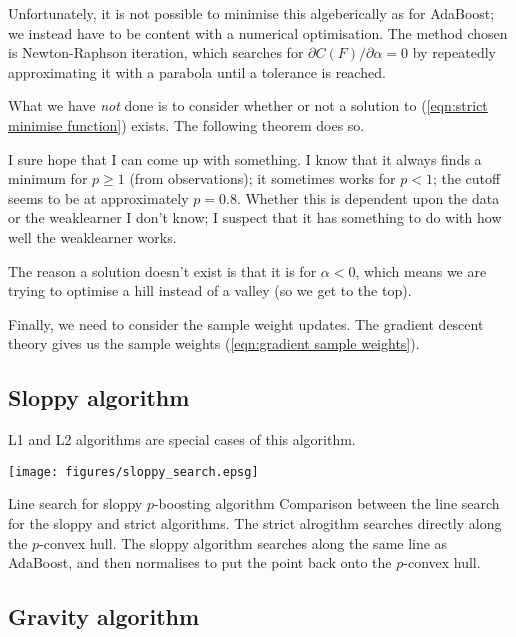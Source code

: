 Unfortunately, it is not possible to minimise this algeberically as
for AdaBoost; we instead have to be content with a numerical
optimisation.  The method chosen is Newton-Raphson iteration, which
searches for $\partial C(F) / \partial \alpha = 0$ by repeatedly
approximating it with a parabola until a tolerance is reached.

What we have \emph{not} done is to consider whether or not a solution
to (\ref{eqn:strict minimise function}) exists.  The following theorem
does so.

\begin{theorem}
I sure hope that I can come up with something.  I know that it always
finds a minimum for $p \geq 1$ (from observations); it sometimes works
for $p < 1$; the cutoff seems to be at approximately $p = 0.8$.
Whether this is dependent upon the data or the weaklearner I don't
know; I suspect that it has something to do with how well the
weaklearner works.

The reason a solution doesn't exist is that it is for $\alpha < 0$,
which means we are trying to optimise a hill instead of a valley (so
we get to the top).
\end{theorem}

Finally, we need to consider the sample weight updates.  The gradient
descent theory gives us the sample weights (\ref{eqn:gradient sample
weights}).

\subsection{Sloppy algorithm}

L1 and L2 algorithms are special cases of this algorithm.

\begin{linefigure}
\begin{center}
\texttt{[image: figures/sloppy\_search.epsg]}
\end{center}
\begin{capt}{Line search for sloppy $p$-boosting algorithm}
Comparison between the line search for the sloppy and strict
algorithms.  The strict alrogithm searches directly along the
$p$-convex hull.  The sloppy algorithm searches along the same line as
AdaBoost, and then normalises to put the point back onto the
$p$-convex hull.
\end{capt}
\label{fig:strict line search}
\end{linefigure}


\subsection{Gravity algorithm}

